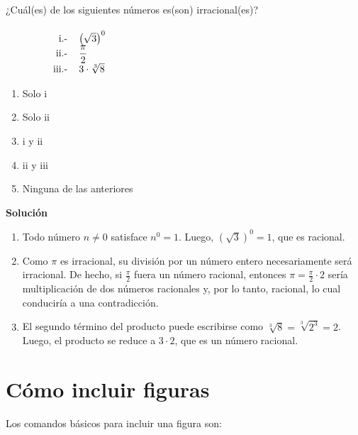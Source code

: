 \documentclass[11pt,letterpaper,twoside]{report}%
\begin{document}
\begin{exbox}{}
¿Cuál(es) de los siguientes números es(son) irracional(es)?\\\\
$\begin{array}{rl}
\hspace{1.5cm}\textrm{i.-}&\, \left(\sqrt{3}\right)^0\\
\hspace{1.5cm}\textrm{ii.-}&\,\displaystyle\frac{\pi}{2}\\
\hspace{1.5cm}\textrm{iii.-}&\, 3\cdot\sqrt[3]{8}
\end{array}$
\begin{enumerate}%
\item Solo i
\item Solo ii
\item i y ii
\item ii y iii
\item Ninguna de las anteriores
\end{enumerate}
\tcblower
\textbf{Solución}
\begin{enumerate}%
\item Todo número $n\neq0$ satisface $n^0=1$. Luego, $\left(\sqrt{3}\right)^0=1$, que es racional.
\item Como $\pi$ es irracional, su división por un número entero necesariamente será irracional. De hecho, si $\displaystyle\frac{\pi}{2}$ fuera un número racional, entonces $\displaystyle\pi=\frac{\pi}{2}\cdot 2$ sería multiplicación de dos números racionales y, por lo tanto, racional, lo cual conduciría a una contradicción.
\item El segundo término del producto puede escribirse como $\sqrt[3]{8}=\sqrt[3]{2^3}=2$. Luego, el producto se reduce a $3\cdot2$, que es un número racional.
\end{enumerate}
\end{exbox}

\section{Cómo incluir figuras}\label{sec:figuras}

Los comandos básicos para incluir una figura son:
\end{document}
